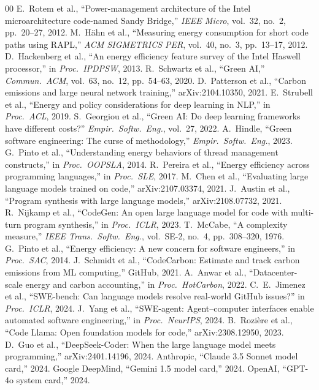 \documentclass[conference]{IEEEtran}
\begin{document}
\begin{thebibliography}{00}
 E.~Rotem et al., ``Power-management architecture of the
Intel microarchitecture code-named Sandy Bridge,'' \emph{IEEE Micro},
vol.~32, no.~2, pp.~20--27, 2012.
 M.~H\"ahn et al., ``Measuring energy consumption for
short code paths using RAPL,'' \emph{ACM SIGMETRICS PER}, vol.~40, no.~3,
pp.~13--17, 2012.
 D.~Hackenberg et al., ``An energy efficiency feature
survey of the Intel Haswell processor,'' in \emph{Proc.\ IPDPSW}, 2013.
 R.~Schwartz et al., ``Green AI,'' \emph{Commun.\ ACM},
vol.~63, no.~12, pp.~54--63, 2020.
 D.~Patterson et al., ``Carbon emissions and large
neural network training,'' arXiv:2104.10350, 2021.
 E.~Strubell et al., ``Energy and policy considerations
for deep learning in NLP,'' in \emph{Proc.\ ACL}, 2019.
 S.~Georgiou et al., ``Green AI: Do deep learning
frameworks have different costs?'' \emph{Empir.\ Softw.\ Eng.}, vol.~27,
2022.
 A.~Hindle, ``Green software engineering: The curse of
methodology,'' \emph{Empir.\ Softw.\ Eng.}, 2023.
 G.~Pinto et al., ``Understanding energy behaviors of
thread management constructs,'' in \emph{Proc.\ OOPSLA}, 2014.
 R.~Pereira et al., ``Energy efficiency across
programming languages,'' in \emph{Proc.\ SLE}, 2017.
 M.~Chen et al., ``Evaluating large language models trained
on code,'' arXiv:2107.03374, 2021.
 J.~Austin et al., ``Program synthesis with large language
models,'' arXiv:2108.07732, 2021.
 R.~Nijkamp et al., ``CodeGen: An open large language
model for code with multi-turn program synthesis,'' in \emph{Proc.\ ICLR},
2023.
 T.~McCabe, ``A complexity measure,'' \emph{IEEE Trans.\
Softw.\ Eng.}, vol.~SE-2, no.~4, pp.~308--320, 1976.
 G.~Pinto et al., ``Energy efficiency: A new concern for
software engineers,'' in \emph{Proc.\ SAC}, 2014.
 J.~Schmidt et al., ``CodeCarbon: Estimate and track
carbon emissions from ML computing,'' GitHub, 2021.
 A.~Anwar et al., ``Datacenter-scale energy and carbon
accounting,'' in \emph{Proc.\ HotCarbon}, 2022.
 C.~E.~Jimenez et al., ``SWE-bench: Can language models
resolve real-world GitHub issues?'' in \emph{Proc.\ ICLR}, 2024.
\bibitem{sweagent2024} J.~Yang et al., ``SWE-agent: Agent--computer interfaces
enable automated software engineering,'' in \emph{Proc.\ NeurIPS}, 2024.
\bibitem{codellama2023} B.~Rozi\`ere et al., ``Code Llama: Open foundation
models for code,'' arXiv:2308.12950, 2023.
 D.~Guo et al., ``DeepSeek-Coder: When the large
language model meets programming,'' arXiv:2401.14196, 2024.
 Anthropic, ``Claude 3.5 Sonnet model card,'' 2024.
\bibitem{gemini2024} Google DeepMind, ``Gemini 1.5 model card,'' 2024.
\bibitem{gpt4o2024} OpenAI, ``GPT-4o system card,'' 2024.
\end{thebibliography}
\end{document}
